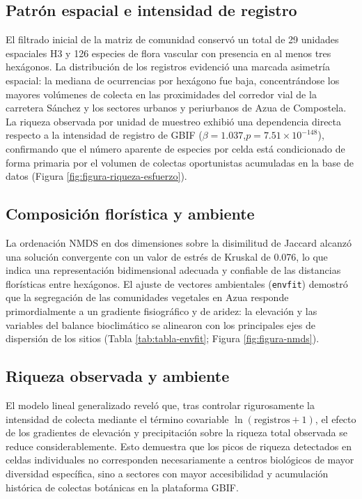 \documentclass[
  12pt,
  man,
  floatsintext]{apa7}
\begin{document}
\subsection{Patrón espacial e intensidad de registro}\label{patruxf3n-espacial-e-intensidad-de-registro}

El filtrado inicial de la matriz de comunidad conservó un total de 29 unidades espaciales H3 y 126 especies de flora vascular con presencia en al menos tres hexágonos. La distribución de los registros evidenció una marcada asimetría espacial: la mediana de ocurrencias por hexágono fue baja, concentrándose los mayores volúmenes de colecta en las proximidades del corredor vial de la carretera Sánchez y los sectores urbanos y periurbanos de Azua de Compostela. La riqueza observada por unidad de muestreo exhibió una dependencia directa respecto a la intensidad de registro de GBIF (\(\beta = 1.037\),\(p = \ensuremath{7.51\times 10^{-148}}\)), confirmando que el número aparente de especies por celda está condicionado de forma primaria por el volumen de colectas oportunistas acumuladas en la base de datos (Figura \ref{fig:figura-riqueza-esfuerzo}).

\subsection{Composición florística y ambiente}\label{composiciuxf3n-floruxedstica-y-ambiente}

La ordenación NMDS en dos dimensiones sobre la disimilitud de Jaccard alcanzó una solución convergente con un valor de estrés de Kruskal de 0.076, lo que indica una representación bidimensional adecuada y confiable de las distancias florísticas entre hexágonos. El ajuste de vectores ambientales (\texttt{envfit}) demostró que la segregación de las comunidades vegetales en Azua responde primordialmente a un gradiente fisiográfico y de aridez: la elevación y las variables del balance bioclimático se alinearon con los principales ejes de dispersión de los sitios (Tabla \ref{tab:tabla-envfit}; Figura \ref{fig:figura-nmds}).

\subsection{Riqueza observada y ambiente}\label{riqueza-observada-y-ambiente}

El modelo lineal generalizado reveló que, tras controlar rigurosamente la intensidad de colecta mediante el término covariable \(\ln(\text{registros} + 1)\), el efecto de los gradientes de elevación y precipitación sobre la riqueza total observada se reduce considerablemente. Esto demuestra que los picos de riqueza detectados en celdas individuales no corresponden necesariamente a centros biológicos de mayor diversidad específica, sino a sectores con mayor accesibilidad y acumulación histórica de colectas botánicas en la plataforma GBIF.
\end{document}
